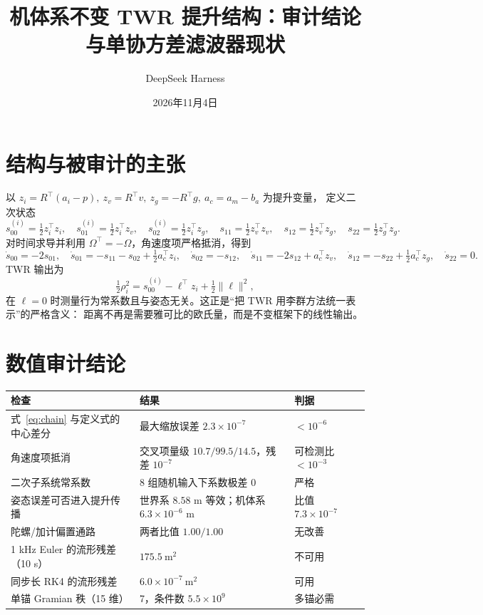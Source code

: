 \documentclass[11pt,a4paper]{ctexart}
\title{机体系不变 TWR 提升结构：审计结论与单协方差滤波器现状}
\author{DeepSeek Harness}
\date{2026年11月4日}
\begin{document}
\maketitle

\section{结构与被审计的主张}

以 \(z_i=R^{\top}(a_i-p),\ z_v=R^{\top}v,\ z_g=-R^{\top}g,\ a_c=a_m-b_a\) 为提升变量，
定义二次状态
\begin{equation}
s_{00}^{(i)}=\tfrac12 z_i^{\top}z_i,\quad
s_{01}^{(i)}=\tfrac12 z_i^{\top}z_v,\quad
s_{02}^{(i)}=\tfrac12 z_i^{\top}z_g,\quad
s_{11}=\tfrac12 z_v^{\top}z_v,\quad
s_{12}=\tfrac12 z_v^{\top}z_g,\quad
s_{22}=\tfrac12 z_g^{\top}z_g .
\end{equation}
对时间求导并利用 \(\Omega^{\top}=-\Omega\)，角速度项严格抵消，得到
\begin{equation}
\dot s_{00}=-2s_{01},\quad
\dot s_{01}=-s_{11}-s_{02}+\tfrac12 a_c^{\top}z_i,\quad
\dot s_{02}=-s_{12},\quad
\dot s_{11}=-2s_{12}+a_c^{\top}z_v,\quad
\dot s_{12}=-s_{22}+\tfrac12 a_c^{\top}z_g,\quad
\dot s_{22}=0 .
\label{eq:chain}
\end{equation}
TWR 输出为
\begin{equation}
\tfrac12\rho_i^2=s_{00}^{(i)}-\ell^{\top}z_i+\tfrac12\|\ell\|^2 ,
\end{equation}
在 \(\ell=0\) 时测量行为常系数且与姿态无关。这正是“把 TWR 用李群方法统一表示”的严格含义：
距离不再是需要雅可比的欧氏量，而是不变框架下的线性输出。

\section{数值审计结论}

\begin{table}[h]
\centering
\small
\begin{tabular}{lll}
\toprule
检查 & 结果 & 判据 \\
\midrule
式~\eqref{eq:chain} 与定义式的中心差分 & 最大缩放误差 \(2.3\times10^{-7}\) & \(<10^{-6}\) \\
角速度项抵消 & 交叉项量级 \(10.7/99.5/14.5\)，残差 \(10^{-7}\) & 可检测比 \(<10^{-3}\) \\
二次子系统常系数 & 8 组随机输入下系数极差 \(0\) & 严格 \\
姿态误差可否进入提升传播 & 世界系 \(8.58\) m 等效；机体系 \(6.3\times10^{-6}\) m & 比值 \(7.3\times10^{-7}\) \\
陀螺/加计偏置通路 & 两者比值 \(1.00/1.00\) & 无改善 \\
1 kHz Euler 的流形残差（10 s） & \(175.5\ \mathrm{m^2}\) & 不可用 \\
同步长 RK4 的流形残差 & \(6.0\times10^{-7}\ \mathrm{m^2}\) & 可用 \\
单锚 Gramian 秩（15 维） & 7，条件数 \(5.5\times10^{9}\) & 多锚必需 \\
\bottomrule
\end{tabular}
\end{table}
\end{document}
